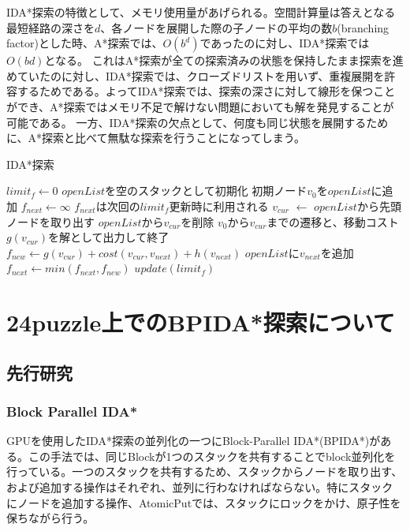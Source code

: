\documentclass[a4paper,11pt,oneside,openany]{jsbook}
\begin{document}
IDA*探索の特徴として、メモリ使用量があげられる。空間計算量は答えとなる最短経路の深さを$d$、各ノードを展開した際の子ノードの平均の数$b$(branching factor)とした時、A*探索では、$O(b^d)$であったのに対し、IDA*探索では$O(bd)$となる。
これはA*探索が全ての探索済みの状態を保持したまま探索を進めていたのに対し、IDA*探索では、クローズドリストを用いず、重複展開を許容するためである。よってIDA*探索では、探索の深さに対して線形を保つことができ、A*探索ではメモリ不足で解けない問題においても解を発見することが可能である。
一方、IDA*探索の欠点として、何度も同じ状態を展開するために、A*探索と比べて無駄な探索を行うことになってしまう。

\begin{algorithm}
\caption{IDA*探索}
\label{alg:pbnf}
\begin{algorithmic}[1]
\State $limit_f \leftarrow 0$
    \State $openList$を空のスタックとして初期化
    \State 初期ノード$v_0$を$openList$に追加
    \State $f_{next} \leftarrow \infty$
    \State $f_{next}$は次回の$limit_f$更新時に利用される 
        \State $v_{cur}$ $\leftarrow$ $openList$から先頭ノードを取り出す
        \State $openList$から$v_{cur}$を削除
            \State $v_0$から$v_{cur}$までの遷移と、移動コスト$g(v_{cur})$を解として出力して終了
        \EndIf
            \State $f_{new} \leftarrow g(v_{cur}) + cost(v_{cur}, v_{next}) + h(v_{next})$
                \State $openList$に$v_{next}$を追加
            \Else
                \State $f_{next} \leftarrow min(f_{next}, f_{new})$
            \EndIf
        \EndFor
    \EndWhile
    \State $update(limit_f)$
\EndWhile
\end{algorithmic}
\end{algorithm}
\newpage



\chapter{24puzzle上でのBPIDA*探索について}
\section{先行研究}
\subsection{Block Parallel IDA*}
GPUを使用したIDA*探索の並列化の一つにBlock-Parallel IDA*(BPIDA*)\cite{Horie17}がある。この手法では、同じBlockが1つのスタックを共有することでblock並列化を行っている。一つのスタックを共有するため、スタックからノードを取り出す、および追加する操作はそれぞれ、並列に行わなければならない。特にスタックにノードを追加する操作、AtomicPutでは、スタックにロックをかけ、原子性を保ちながら行う。
\end{document}
